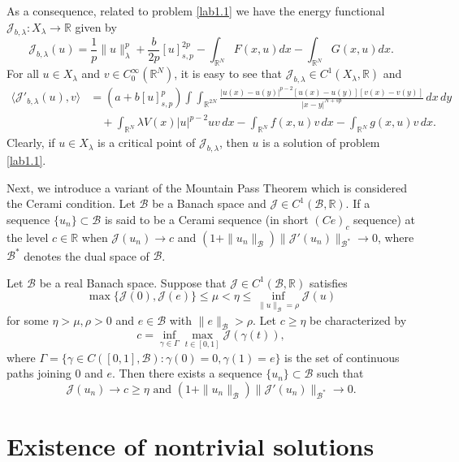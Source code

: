 \documentclass[reqno]{amsart}
\begin{document}
As a consequence, related to problem \eqref{lab1.1} we have the energy functional 
$\mathcal{J}_{b,\lambda}:X_\lambda\to \mathbb{R}$ given by
\[
 \mathcal{J}_{b,\lambda}(u)= \frac{1}{p}\|u\|^p_\lambda+\frac{b}{2p}[u]^{2p}_{s,p}
 -\int_{\mathbb{R}^N}F(x,u)dx-\int_{\mathbb{R}^N}G(x,u)dx.
\]
For all $u\in X_\lambda$ and $v\in C_0^\infty(\mathbb{R}^N)$, it is easy to see that 
$\mathcal{J}_{b,\lambda}\in C^1({X_\lambda},\mathbb{R})$ and
\begin{align*}
\langle \mathcal{J}'_{b,\lambda}(u),v\rangle
&= (a+b[u]^p_{s,p})
\int\int_{\mathbb{R}^{2N}}\frac{|u(x)-u(y)|^{p-2}[u(x)-u(y)][v(x)-v(y)]}
{|x-y|^{N+sp}}\,dx\,dy    \\
&\quad +\int_{\mathbb{R}^N}\lambda V(x)|u|^{p-2}uv\,dx
-\int_{\mathbb{R}^N}f(x,u)v\,dx-\int_{\mathbb{R}^N}g(x, u)v\,dx.
\end{align*}
Clearly, if $u\in X_\lambda$ is a critical point of $\mathcal{J}_{b,\lambda}$, 
then $u$ is a solution of problem \eqref{lab1.1}.

Next, we introduce a variant of the Mountain Pass Theorem  \cite{r7} which is 
considered the Cerami condition. Let $\mathcal{B}$ be a Banach space and 
$\mathcal{J} \in C^1(\mathcal{B}, \mathbb{R})$. 
If a sequence $\{u_n\}\subset \mathcal{B}$ is said to be a Cerami sequence 
(in short $(Ce)_c$ sequence) at the level $c\in \mathbb{R}$ when 
$\mathcal{J}(u_n)\to  c$ and 
$(1+\|u_n\|_\mathcal{B})\|\mathcal{J}'(u_n)\|_{\mathcal{B}^*}\to  0$, where 
$\mathcal{B}^*$ denotes the dual space of $\mathcal{B}$.

\begin{theorem} \label{thm2.4}
Let $\mathcal{B}$ be a real Banach space. Suppose that 
$\mathcal{J} \in C^1(\mathcal{B}, \mathbb{R})$ satisfies
$$
\max \{\mathcal{J}(0), \mathcal{J}(e)\}
\leq \mu<\eta\leq \inf_{\|u\|_\mathcal{B}=\rho}\mathcal{J}(u)
$$
for some $\eta>\mu, \rho>0$ and $e\in \mathcal{B}$ with $\|e\|_\mathcal{B}>\rho$. 
Let $c\geq \eta$ be characterized by
$$
c=\inf_{\gamma\in\Gamma}\max_{t\in[0,1]}\mathcal{J}(\gamma(t)),
$$
where $\Gamma=\{\gamma\in C([0,1],\mathcal{B}):\gamma(0)=0,\gamma(1)=e\}$ is the set 
of continuous paths joining $0$ and $e$. Then there exists a sequence 
$\{u_n\} \subset \mathcal{B}$ such that
$$
\mathcal{J}(u_n)\to  c\geq \eta\text{ and }
 (1+\|u_n\|_\mathcal{B})\|\mathcal{J}'(u_n)\|_{\mathcal{B}^*}\to  0.
 $$
\end{theorem}

\section{Existence of nontrivial solutions}
\end{document}
